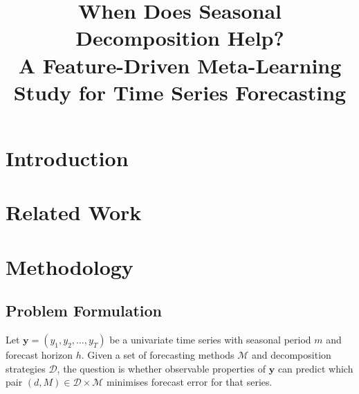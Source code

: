 \documentclass[pdflatex,sn-mathphys-num]{sn-jnl}
\theoremstyle{thmstyleone}
\theoremstyle{thmstyletwo}
\theoremstyle{thmstylethree}
\begin{document}
\title[Feature-Driven Meta-Learning for Decomposition Strategy Selection]{%
  When Does Seasonal Decomposition Help?\\
  A Feature-Driven Meta-Learning Study for Time Series Forecasting}

\author*[1]{ }


\abstract{%
}


\maketitle

\section{Introduction}\label{sec:intro}

\section{Related Work}\label{sec:related}

\section{Methodology}\label{sec:methodology}

\subsection{Problem Formulation}\label{sec:problem}

Let $\mathbf{y} = (y_1, y_2, \ldots, y_T)$ be a univariate time series with
seasonal period $m$ and forecast horizon $h$.
Given a set of forecasting methods $\mathcal{M}$ and decomposition strategies
$\mathcal{D}$, the question is whether observable properties of $\mathbf{y}$ can
predict which pair $(d, M) \in \mathcal{D} \times \mathcal{M}$ minimises forecast
error for that series.
\end{document}
